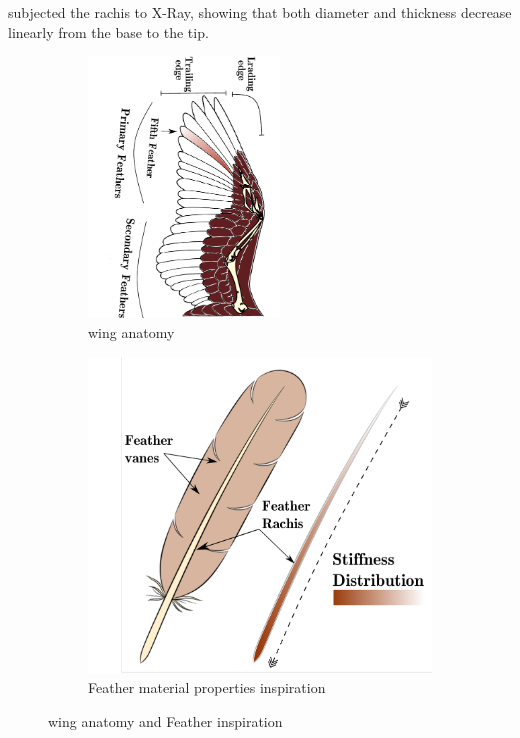 \documentclass[conf]{new-aiaa}
\begin{document}
\citet{Pabisch2010KeratinAlba} subjected the rachis to X-Ray, showing that both diameter and thickness decrease linearly from the base to the tip.

\begin{figure}[ht!]
\centering
\begin{subfigure}{.55\textwidth}
\centering
\includegraphics[width=2in, angle=90]{Figures/wing-primarySecondary.pdf}
\caption{wing anatomy}
\label{fig:anatomy} 
\end{subfigure}
\begin{subfigure}{.4\textwidth}
\centering
\includegraphics[width=.85\columnwidth]{Figures/shaft_drawing.pdf}
\caption{Feather material properties inspiration}\label{fig:inspiration} 
\end{subfigure}
\caption{wing anatomy and Feather inspiration}
\label{fig:Ggeometry}
\end{figure}
\end{document}
